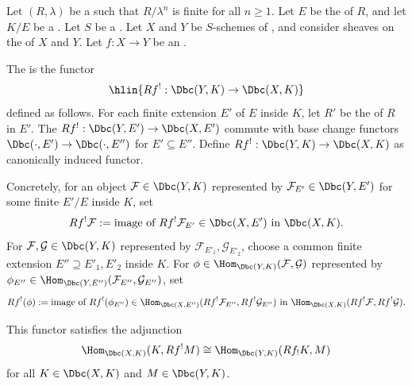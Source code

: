 \begin{definition} \label{definition:exceptional_inverse_image_functor_on_bdd_const_derived_category_of_adic_sheaves_with_algebraic_coefficients_on_schemes_of_finite_type_over_a_a_noetherian_scheme_via_a_compactifiable_morphism}
    Let $(R, \lambda)$ be a   such that $R/\lambda^n$ is finite for all $n \geq 1$. Let $E$ be the  of $R$, and let $K/E$ be a . Let $S$ be a . Let $X$ and $Y$ be $S$-schemes of , and consider sheaves on the  of $X$ and $Y$. Let $f: X \to Y$ be an .

    The  is the functor
    $$\hlin{Rf^! : \Dbc(Y, K) \to \Dbc(X, K)}$$
    defined as follows. For each finite extension $E'$ of $E$ inside $K$, let $R'$ be the  of $R$ in $E'$. The  $Rf^!: \Dbc(Y, E') \to \Dbc(X, E')$ commute with base change functors $\Dbc(\cdot, E') \to \Dbc(\cdot, E'')$ for $E' \subseteq E''$. Define $Rf^!: \Dbc(Y, K) \to \Dbc(X, K)$ as canonically induced functor.

    Concretely, for an object $\mathcal{F} \in \Dbc(Y, K)$ represented by $\mathcal{F}_{E'} \in \Dbc(Y, E')$ for some finite $E'/E$ inside $K$, set
    $$Rf^! \mathcal{F} := \text{image of } Rf^! \mathcal{F}_{E'} \in \Dbc(X, E') \text{ in } \Dbc(X, K).$$
    For $\mathcal{F}, \mathcal{G} \in \Dbc(Y, K)$ represented by $\mathcal{F}_{E'_1}, \mathcal{G}_{E'_2}$, choose a common finite extension $E'' \supseteq E'_1, E'_2$ inside $K$. For $\phi \in \Hom_{\Dbc(Y, K)}(\mathcal{F}, \mathcal{G})$ represented by $\phi_{E''} \in \Hom_{\Dbc(Y, E'')}(\mathcal{F}_{E''}, \mathcal{G}_{E''})$, set
    $$Rf^! (\phi) := \text{image of } Rf^!(\phi_{E''}) \in \Hom_{\Dbc(X, E'')}(Rf^! \mathcal{F}_{E''}, Rf^! \mathcal{G}_{E''}) \text{ in } \Hom_{\Dbc(X, K)}(Rf^! \mathcal{F}, Rf^! \mathcal{G}).$$

    This functor satisfies the adjunction
    $$\Hom_{\Dbc(X,K)}(K, Rf^! M) \cong \Hom_{\Dbc(Y,K)}(Rf_! K, M)$$
    for all $K \in \Dbc(X, K)$ and $M \in \Dbc(Y, K)$.
\end{definition}
